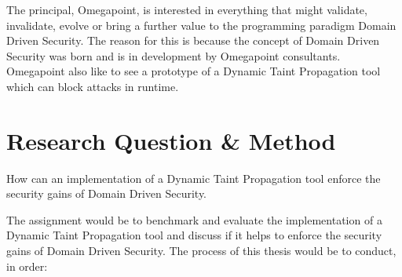 \documentclass{../kththesis}
\begin{document}
The principal, Omegapoint, is interested in everything that might validate, invalidate, evolve or bring a further value to the programming paradigm Domain Driven Security. The reason for this is because the concept of Domain Driven Security was born and is in development by Omegapoint consultants. Omegapoint also like to see a prototype of a Dynamic Taint Propagation tool which can block attacks in runtime.



\chapter{Research Question \& Method} \label{ResearchQuestionMethod}
\begin{chapquote}{}
	How can an implementation of a Dynamic Taint Propagation tool enforce the security gains of Domain Driven Security.
\end{chapquote}

\noindent
The assignment would be to benchmark and evaluate the implementation of a Dynamic Taint Propagation tool and discuss if it helps to enforce the security gains of Domain Driven Security. The process of this thesis would be to conduct, in order:
\end{document}
